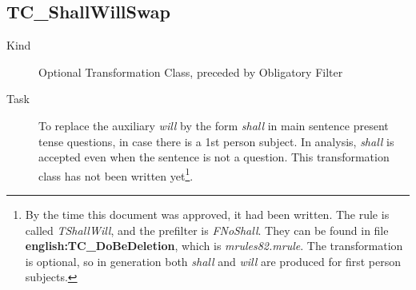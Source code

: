 \newpage
\subsection{TC\_ShallWillSwap}
\begin{description}
\item[Kind] Optional Transformation Class, preceded by Obligatory Filter
\item[Task] To replace the auxiliary {\em will\/} by the form {\em shall\/} in 
main sentence present tense questions, in case there is a 1st person subject. 
In analysis, {\em shall\/} is accepted even when the sentence is not a 
question. This transformation class has not been written yet\footnote{By the 
time this document was approved, it had been written. The rule is called {\em 
TShallWill\/}, and the prefilter is {\em FNoShall\/}. They can be found in file 
{\bf english:TC\_DoBeDeletion}, which is {\em mrules82.mrule\/}. The 
transformation is optional, 
so in generation both {\em shall\/} and {\em will\/} are produced for first 
person subjects.}.

\end{description}

\newpage
